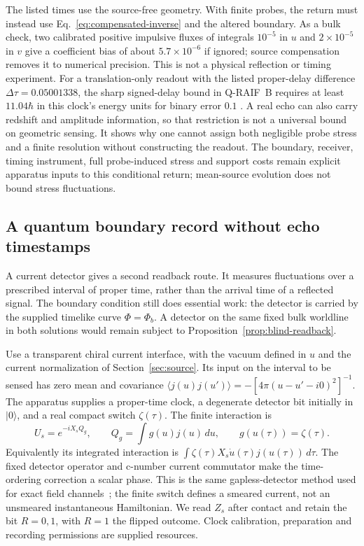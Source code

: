 \documentclass[12pt,a4paper]{article}
\begin{document}
The listed times use the source-free geometry. With finite probes, the return
must instead use Eq.~\eqref{eq:compensated-inverse} and the altered boundary.
As a bulk check, two calibrated positive impulsive fluxes of integrals
$10^{-5}$ in $u$ and $2\times10^{-5}$ in $v$ give a coefficient bias of about
$5.7\times10^{-6}$ if ignored; source compensation removes it to numerical
precision. This is not a physical reflection or timing experiment. For a
translation-only readout with the listed proper-delay difference
$\Delta\tau=0.05001338$, the sharp signed-delay bound in Q-RAIF~B requires
at least $11.04\hbar$ in this clock's energy units for binary error $0.1$
\cite{Liu2026QRAIFB}. A real echo can also carry redshift and amplitude information,
so that restriction is not a universal bound on geometric sensing. It shows why
one cannot assign both negligible probe stress and a finite resolution without
constructing the readout. The boundary, receiver, timing instrument, full
probe-induced stress and support costs remain explicit apparatus inputs to this
conditional return; mean-source evolution does not bound stress fluctuations.

\subsection{A quantum boundary record without echo timestamps}
\label{sec:boundary-current-sensor}

A current detector gives a second readback route. It measures fluctuations over
a prescribed interval of proper time, rather than the arrival time of a reflected
signal. The boundary condition still does essential work: the detector is carried
by the supplied timelike curve $\Phi=\Phi_b$. A detector on the same fixed bulk
worldline in both solutions would remain subject to
Proposition~\ref{prop:blind-readback}.

Use a transparent chiral current interface, with the vacuum defined in $u$ and
the current normalization of Section~\ref{sec:source}. Its input on the interval
to be sensed has zero mean and covariance
$\langle j(u)j(u')\rangle=-[4\pi(u-u'-i0)^2]^{-1}$. The apparatus supplies a
proper-time clock, a degenerate detector bit initially in $|0\rangle$, and a real
compact switch $\zeta(\tau)$. The finite interaction is
\begin{equation}\label{eq:boundary-sensor-unitary}
 U_s=e^{-iX_sQ_g},\qquad
 Q_g=\int g(u)j(u)\,du,\qquad
 g(u(\tau))=\zeta(\tau).
\end{equation}
Equivalently its integrated interaction is
$\int\zeta(\tau)X_s\dot u(\tau)j(u(\tau))\,d\tau$.
The fixed detector operator and c-number current commutator make the
time-ordering correction a scalar phase. This is the same gapless-detector
method used for exact field channels~\cite{Landulfo2016}; the finite switch
defines a smeared current, not an unsmeared instantaneous Hamiltonian.
We read $Z_s$ after contact and retain the bit $R=0,1$, with $R=1$ the flipped
outcome. Clock calibration, preparation and recording permissions are supplied
resources.
\end{document}
